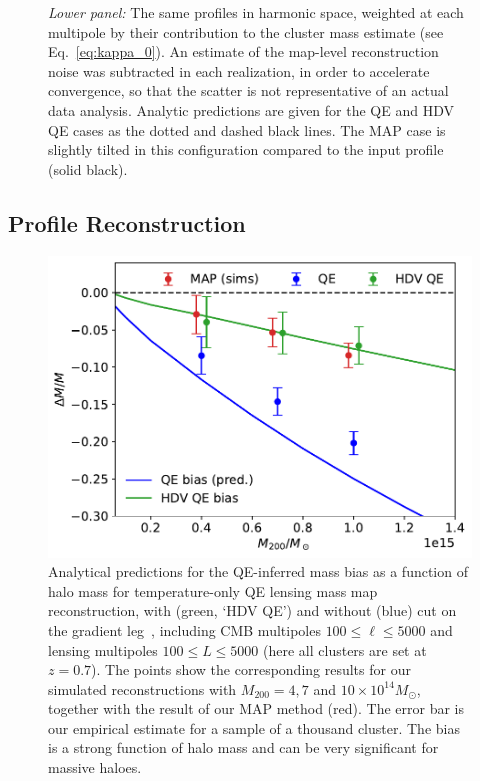 \documentclass[prd, superscriptaddress, tightenlines, longbibliography, nofootinbib, eqsecnum, amsfonts, amsmath, floatfix, twocolumn, notitlepage]{revtex4-2}
\newcommand{\bb}[1]{\textcolor{teal}{#1}}
\begin{document}
\begin{figure}[H]
{		\emph{Lower panel:} The same profiles in harmonic space, weighted at each multipole by their contribution to the cluster mass estimate (see Eq.~\eqref{eq:kappa_0}). An estimate of the map-level reconstruction noise was subtracted in each realization, in order to accelerate convergence, so that the scatter is not representative of an actual data analysis. %
		Analytic predictions are given for the QE and HDV QE cases as the dotted and dashed black lines. The MAP case is slightly tilted in this configuration compared to the input profile (solid black). }
	\label{fig:Bias_sup}
\end{figure}

\subsection{Profile Reconstruction}
\label{subsec:profilerec}

\begin{figure}
	\includegraphics[width=0.95\hsize]{Figures/biaspred}
	\caption{Analytical predictions for the QE-inferred mass bias as a function of halo mass for temperature-only QE lensing mass map reconstruction, with (green, `HDV QE') and without (blue) cut on the gradient leg~\cite{Hu:2007bt}, including CMB multipoles $100 \leq \ell \leq 5000$ and lensing multipoles $100 \leq L \leq 5000$ (here all clusters are set at $z=0.7$). The points show the corresponding results for our simulated reconstructions with $M_{200}=4, 7$ and $10\times 10^{14} M_\odot$, together with the result of our MAP method (red). The error bar is our empirical estimate for a sample of a thousand cluster. The bias is a strong function of halo mass and can be very significant for massive haloes. }
	\label{fig:biaspred}
\end{figure}
\end{document}
